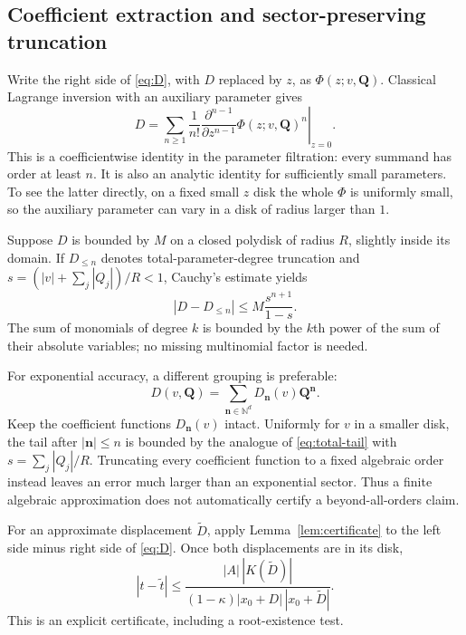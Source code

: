 \documentclass[11pt,a4paper]{article}
\numberwithin{equation}{section}
\theoremstyle{definition}\newtheorem{definition}[theorem]{Definition}
\theoremstyle{remark}\newtheorem{remark}[theorem]{Remark}
\newcommand{\N}{\mathbb N}\newcommand{\R}{\mathbb R}
\newcommand{\vct}[1]{\boldsymbol{#1}}
\begin{document}
\subsection{Coefficient extraction and sector-preserving truncation}
Write the right side of \eqref{eq:D}, with $D$ replaced by $z$, as
$\Phi(z;v,\vct Q)$. Classical Lagrange inversion with an auxiliary
parameter gives
\begin{equation}\label{eq:lagrange-D}
 D=\sum_{n\ge1}\frac1{n!}
 \left.\frac{\partial^{n-1}}{\partial z^{n-1}}
 \Phi(z;v,\vct Q)^n\right|_{z=0}.
\end{equation}
This is a coefficientwise identity in the parameter filtration: every
summand has order at least $n$. It is also an analytic identity for
sufficiently small parameters. To see the latter directly, on a fixed
small $z$ disk the whole $\Phi$ is uniformly small, so the auxiliary
parameter can vary in a disk of radius larger than $1$.

Suppose $D$ is bounded by $M$ on a closed polydisk of radius $R$, slightly
inside its domain. If $D_{\le n}$ denotes total-parameter-degree
truncation and
$s=(|v|+\sum_j|Q_j|)/R<1$, Cauchy's estimate yields
\begin{equation}\label{eq:total-tail}
 |D-D_{\le n}|\le M\frac{s^{n+1}}{1-s}.
\end{equation}
The sum of monomials of degree $k$ is bounded by the $k$th power of the
sum of their absolute variables; no missing multinomial factor is needed.

For exponential accuracy, a different grouping is preferable:
\begin{equation}\label{eq:action-block}
 D(v,\vct Q)=\sum_{\vct n\in\N^d}D_{\vct n}(v)\vct Q^{\vct n}.
\end{equation}
Keep the coefficient functions $D_{\vct n}(v)$ intact. Uniformly for $v$
in a smaller disk, the tail after $|\vct n|\le n$ is bounded by the
analogue of \eqref{eq:total-tail} with
$s=\sum_j|Q_j|/R$. Truncating every coefficient function to a fixed
algebraic order instead leaves an error much larger than an exponential
sector. Thus a finite algebraic approximation does not automatically
certify a beyond-all-orders claim.

For an approximate displacement $\widetilde D$, apply
Lemma~\ref{lem:certificate} to the left side minus right side of
\eqref{eq:D}. Once both displacements are in its disk,
\begin{equation}\label{eq:t-residual}
 |t-\widetilde t|
 \le\frac{|A|\,|K(\widetilde D)|}
 {(1-\kappa)|x_0+D|\,|x_0+\widetilde D|}.
\end{equation}
This is an explicit certificate, including a root-existence test.
\end{document}
